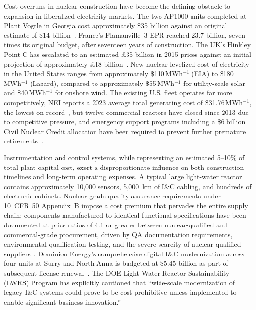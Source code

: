 Cost overruns in nuclear construction have become the defining obstacle to
expansion in liberalized electricity markets. The two AP1000 units completed
at Plant Vogtle in Georgia cost approximately \$35 billion against an original
estimate of \$14 billion~\cite{AJC_Vogtle}. France's Flamanville~3 EPR
reached \texteuro{}23.7 billion, seven times its original budget, after
seventeen years of construction. The UK's Hinkley Point C has escalated to
an estimated £35 billion in 2015 prices against an initial projection of
approximately £18 billion~\cite{CounterPunch_HPC}. New nuclear levelized
cost of electricity in the United States ranges from approximately
\$110\,MWh$^{-1}$ (EIA) to \$180\,MWh$^{-1}$ (Lazard), compared to
approximately \$55\,MWh$^{-1}$ for utility-scale solar and
\$40\,MWh$^{-1}$ for onshore wind. The existing U.S. fleet operates far
more competitively, NEI reports a 2023 average total generating cost of
\$31.76\,MWh$^{-1}$, the lowest on record~\cite{NEI_Costs_2025}, but
twelve commercial reactors have closed since 2013 due to competitive
pressure, and emergency support programs including a \$6 billion Civil
Nuclear Credit allocation have been required to prevent further
premature retirements~\cite{NBC_CivilNuclear}.

Instrumentation and control systems, while representing an estimated 5--10\%
of total plant capital cost, exert a disproportionate influence on both
construction timelines and long-term operating expenses. A typical large
light-water reactor contains approximately 10,000 sensors, 5,000~km of
I\&C cabling, and hundreds of electronic cabinets. Nuclear-grade quality
assurance requirements under 10~CFR~50 Appendix~B impose a cost premium that
pervades the entire supply chain: components manufactured to identical
functional specifications have been documented at price ratios of 4:1 or
greater between nuclear-qualified and commercial-grade procurement, driven
by QA documentation requirements, environmental qualification testing, and
the severe scarcity of nuclear-qualified suppliers~\cite{ANS_ICModernization_2025}.
Dominion Energy's comprehensive digital I\&C modernization across four units
at Surry and North Anna is budgeted at \$5.45 billion as part of subsequent
license renewal~\cite{PowerEng_DigitalAge}. The DOE Light Water Reactor
Sustainability (LWRS) Program has explicitly cautioned that
``wide-scale modernization of legacy I\&C systems could prove to be
cost-prohibitive unless implemented to enable significant business innovation.''

